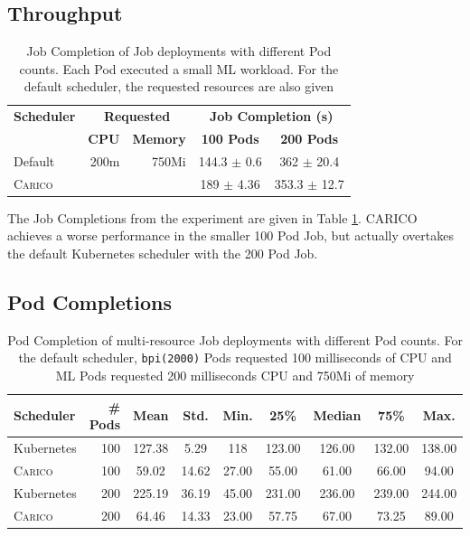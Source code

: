 \subsection{Throughput}
\begin{table}[H]
\centering
    \begin{tabular}{|l|r|r|c|c|}
    \hline
    \textbf{Scheduler} & \multicolumn{2}{c|}{\textbf{Requested}} &
        \multicolumn{2}{c|}{\textbf{Job Completion (s)}} \\ \cline{2-5}
    &  \textbf{CPU} & \textbf{Memory} & \textbf{100 Pods} & \textbf{200 Pods} \\
    \hline
        Default & 200m & 750Mi & 144.3 $\pm$ 0.6 & 362 $\pm$ 20.4\\
        \textsc{Carico} &  &  & 189 $\pm$ 4.36 & 353.3 $\pm$ 12.7 \\
    \hline
    \end{tabular}
    \caption{Job Completion of Job deployments with different Pod counts. Each
    Pod executed a small ML workload. For the default scheduler, the requested
    resources are also given}
    \label{tab:ml-throughput}
\end{table}
The Job Completions from the experiment are given in Table
\ref{tab:ml-throughput}. CARICO achieves a worse performance in the smaller 100
Pod Job, but actually overtakes the default Kubernetes scheduler with the 200
Pod Job.

\subsection{Pod Completions}
\begin{table}[H]
\centering
    \begin{tabular}{|l|r|c|c|c|c|c|c|c|}
    \hline
        \bfseries Scheduler & \bfseries \# Pods & \bfseries Mean & \bfseries Std. &
        \bfseries Min. & \bfseries 25\% & \bfseries Median & \bfseries 75\% & \bfseries Max. \\
    \hline
        Kubernetes & 100 & 127.38 & 5.29 & 118 & 123.00 & 126.00 & 132.00 &
        138.00 \\
        \textsc{Carico} & 100 & 59.02 & 14.62 & 27.00 & 55.00 & 61.00 & 66.00 & 94.00 \\
        Kubernetes & 200 & 225.19 & 36.19 & 45.00 & 231.00 & 236.00 & 239.00 &
        244.00\\
        \textsc{Carico} & 200 & 64.46 & 14.33 & 23.00 & 57.75 & 67.00 & 73.25 & 89.00 \\
    \hline
    \end{tabular}
    \caption{Pod Completion of multi-resource Job deployments with different Pod
    counts. For the default scheduler, \texttt{bpi(2000)} Pods requested 100
    milliseconds of CPU and ML Pods requested 200 milliseconds CPU and 750Mi of
    memory}
    \label{tab:mem-pod-completions}
\end{table}

